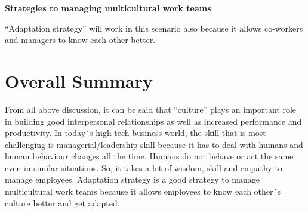 \documentclass{article}
\begin{document}
\textbf{Strategies to managing multicultural work teams}

“Adaptation strategy” will work in this scenario also because it allows co-workers and managers to know each other better. 

\section*{Overall Summary}

From all above discussion, it can be said that “culture” plays an important role in building good interpersonal relationships as well as increased performance and productivity. In today´s high tech business world, the skill that is most challenging is managerial/leadership skill because it has to deal with humans and human behaviour changes all the time. Humans do not behave or act the same even in similar situations. So, it takes a lot of wisdom, skill and empathy to manage employees. Adaptation strategy is a good strategy to manage multicultural work teams because it allows employees to know each other´s culture better and get adapted.  


% 
% 
\newpage
\printbibliography
\end{document}
